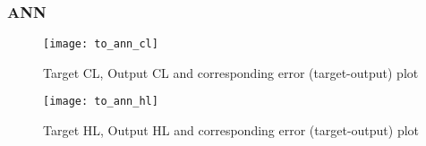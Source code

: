   \subsubsection{ANN}
  \begin{figure}[h!]
      \centering
      \texttt{[image: to\_ann\_cl]}
      \caption{Target CL, Output CL and corresponding error (target-output) plot}
      \label{fig:to_ann_cl}                    
  \end{figure}
  \begin{figure}[h!]
      \centering
      \texttt{[image: to\_ann\_hl]}
      \caption{Target HL, Output HL and corresponding error (target-output) plot}
      \label{fig:to_ann_hl}                    
  \end{figure}
  
